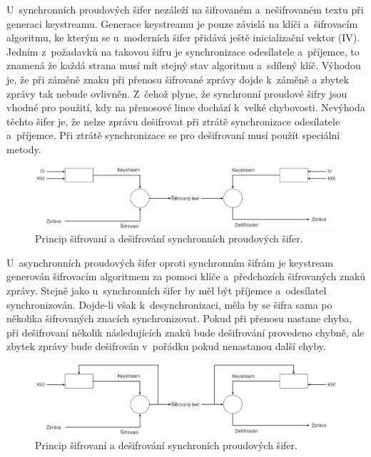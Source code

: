 U~synchronních proudových šifer nezáleží na šifrovaném a~nešifrovaném textu při generaci keystreamu. Generace keystreamu je pouze závislá na klíči a~šifrovacím algoritmu, ke kterým se u~moderních šifer přidává ještě inicializační vektor (IV).\cite{EncyclopediaSynchronous} Jedním z~požadavků na takovou šifru je synchronizace odesílatele a~příjemce, to znamená že každá strana musí mít stejný stav algoritmu a~sdílený klíč. Výhodou je, že při záměně znaku při přenosu šifrované zprávy dojde k~záměně a zbytek zprávy tak nebude ovlivněn. Z~čehož plyne, že synchronní proudové šifry jsou vhodné pro použití, kdy na přenosové lince dochází k~velké chybovosti. Nevýhoda těchto šifer je, že nelze zprávu dešifrovat při ztrátě synchronizace odesílatele a~příjemce. Při ztrátě synchronizace se pro dešifrovaní musí použít speciální metody. \cite{HavlicekBakalarka}
\begin{figure}[!h]
  \begin{center}
    \includegraphics[scale=0.3]{obrazky/synchronousCipher.png}
  \end{center}
  \caption[Synchronní proudová šifra]{Princip šifrovaní a dešifrování synchronních proudových šifer.\cite{EncyclopediaSynchronous}}
  \label{img:synchoronstream}
\end{figure}

U~asynchronních proudových šifer oproti synchronním šifrám je keystream generován šifrovacím algoritmem za pomoci klíče a~předchozích šifrovaných znaků zprávy. Stejně jako u~synchronních šifer by měl být příjemce a~odesílatel synchronizován. Dojde-li však k~desynchronizaci, měla by se šifra sama po několika šifrovaných znacích synchronizovat. Pokud při přenosu nastane chyba, při dešifrovaní několik následujících znaků bude dešifrování provedeno chybně, ale zbytek zprávy bude dešifrován v~pořádku pokud nenastanou další chyby.\cite{HavlicekBakalarka} %
\begin{figure}[!h]
  \begin{center}
    \includegraphics[scale=0.3]{obrazky/asynchronousCipher.png}
  \end{center}
  \caption[Asynchroní proudová šifra]{Princip šifrovaní a dešifrování synchroních proudových šifer.\cite{EncyclopediaAsynchronous}}
  \label{img:asynchronstream}
\end{figure}

